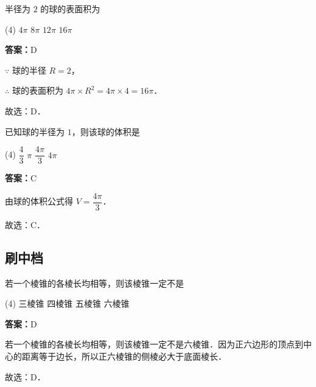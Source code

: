 \vspace{2em}


\begin{example}[\bkstar{2}{5}]
半径为 $2$ 的球的表面积为
\begin{tasks}(4)
    \task $4\pi$
    \task $8\pi$
    \task $12\pi$
    \task $16\pi$
\end{tasks}
\end{example}
\begin{solution}
\textbf{答案：}D

$\because$ 球的半径 $R=2$，

$\therefore$ 球的表面积为 $4\pi\times R^2=4\pi\times 4=16\pi$．

故选：D．
\end{solution}

\vspace{2em}

\begin{example}[\bkstar{1}{5}]
已知球的半径为 $1$，则该球的体积是
\begin{tasks}(4)
    \task $\dfrac{4}{3}$
    \task $\pi$
    \task $\dfrac{4\pi}{3}$
    \task $4\pi$
\end{tasks}
\end{example}
\begin{solution}
\textbf{答案：}C

由球的体积公式得 $V=\dfrac{4\pi}{3}$．

故选：C．
\end{solution}

\vspace{2em}

\subsection{刷中档}

\begin{example}[\bkstar{2}{5}]
若一个棱锥的各棱长均相等，则该棱锥一定不是
\begin{tasks}(4)
    \task 三棱锥
    \task 四棱锥
    \task 五棱锥
    \task 六棱锥
\end{tasks}
\end{example}
\begin{solution}
\textbf{答案：}D

若一个棱锥的各棱长均相等，则该棱锥一定不是六棱锥．因为正六边形的顶点到中心的距离等于边长，所以正六棱锥的侧棱必大于底面棱长．

故选：D．
\end{solution}

